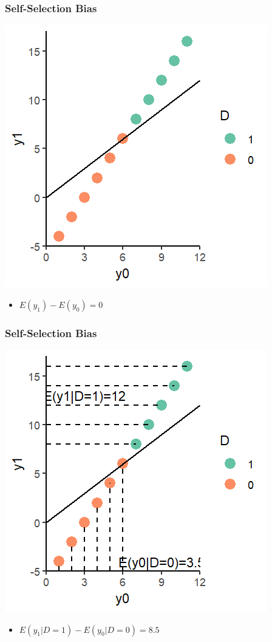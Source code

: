 \documentclass[xcolor=x11names,compress]{beamer}\usepackage[]{graphicx}\usepackage[]{color}
\makeatletter
\def\maxwidth{ %
  \ifdim\Gin@nat@width>\linewidth
    \linewidth
  \else
    \Gin@nat@width
  \fi
}
\newenvironment{knitrout}{}{} %
\renewcommand{\(}{\begin{columns}}
\renewcommand{\)}{\end{columns}}
\newcommand{\<}[1]{\begin{column}{#1}}
\renewcommand{\>}{\end{column}}
\makeatother
\begin{document}
\begin{frame}
\frametitle{Self-Selection Bias}
\begin{knitrout}
\color{fgcolor}
\includegraphics[width=\maxwidth]{figure/SSB2-1} 

\end{knitrout}
\begin{itemize}
\item $E(y_1)-E(y_0)=0$
\end{itemize}
\end{frame}

\begin{frame}
\frametitle{Self-Selection Bias}
\begin{knitrout}
\color{fgcolor}
\includegraphics[width=\maxwidth]{figure/SSB3-1} 

\end{knitrout}
\begin{itemize}
\item $E(y_1|D=1)-E(y_0|D=0)=8.5$
\end{itemize}
\end{frame}
\end{document}
